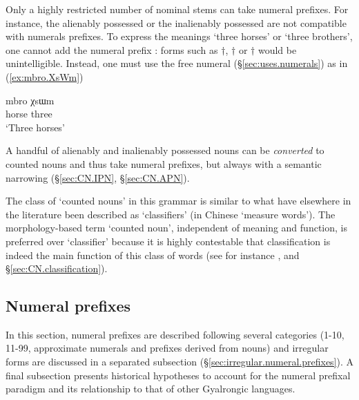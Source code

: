 Only a highly restricted number of nominal stems can take numeral prefixes. For instance, the alienably possessed  or the inalienably possessed  are not compatible with numerals prefixes. To express the meanings `three horses' or `three brothers', one cannot add the numeral prefix : forms such as $\dagger$, $\dagger$ or $\dagger$ would be unintelligible. Instead, one must use the free numeral  (§\ref{sec:uses.numerals}) as in (\ref{ex:mbro.XsWm}) 

\begin{exe}
\ex \label{ex:mbro.XsWm}
\gll mbro χsɯm \\
horse three \\
\glt `Three horses'
\end{exe}

A handful of alienably and inalienably possessed nouns can be \textit{converted} to counted nouns and thus take numeral prefixes, but always with a semantic narrowing (§\ref{sec:CN.IPN}, §\ref{sec:CN.APN}).

The class of `counted nouns' in this grammar is similar to what have elsewhere in the literature been described as `classifiers' (in Chinese   `measure words'). The morphology-based term `counted noun', independent of meaning and function, is preferred over `classifier' because it is highly contestable that classification is indeed the main function of this class of words (see for instance  \citealt{francois99classificateurs}, and §\ref{sec:CN.classification}). 

\subsection{Numeral prefixes} \label{sec:numeral.prefixes}
In this section, numeral prefixes are described following several categories (1-10, 11-99, approximate numerals and prefixes derived from nouns) and irregular forms are discussed in a separated subsection (§\ref{sec:irregular.numeral.prefixes}). A final subsection presents historical hypotheses to account for the numeral prefixal paradigm and its relationship to that of other Gyalrongic languages.



